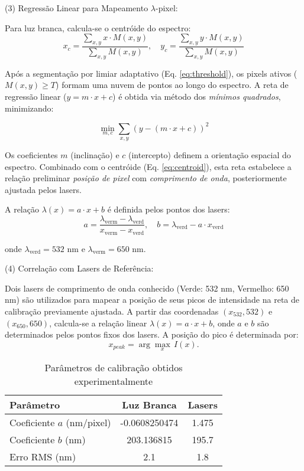 \documentclass[a4paper]{ifacconf}
\begin{document}
(3) Regressão Linear para Mapeamento $\lambda$-pixel:

Para luz branca, calcula-se o centróide do espectro:
\begin{equation}
    x_c = \frac{\sum_{x,y} x \cdot M(x,y)}{\sum_{x,y} M(x,y)}, \quad
    y_c = \frac{\sum_{x,y} y \cdot M(x,y)}{\sum_{x,y} M(x,y)}
    \label{eq:centroid}
\end{equation}

Após a segmentação por limiar adaptativo (Eq. \ref{eq:threshold}), os pixels ativos (\(M(x,y) \geq T\)) formam uma nuvem de pontos ao longo do espectro. A reta de regressão linear (\(y = m \cdot x + c\)) é obtida via método dos \textit{mínimos quadrados}, minimizando:  

\begin{equation}  
    \min_{m,c} \sum_{x,y} \left(y - (m \cdot x + c)\right)^2 
\end{equation}  

Os coeficientes \(m\) (inclinação) e \(c\) (intercepto) definem a orientação espacial do espectro. Combinado com o centróide (Eq. \ref{eq:centroid}), esta reta estabelece a relação preliminar \textit{posição de pixel} com \textit{comprimento de onda}, posteriormente ajustada pelos lasers.  


A relação \(\lambda(x) = a \cdot x + b\) é definida pelos pontos dos lasers:
\begin{equation}
    a = \frac{\lambda_{\text{verm}} - \lambda_{\text{verd}}}{x_{\text{verm}} - x_{\text{verd}}}, \quad  
    b = \lambda_{\text{verd}} - a \cdot x_{\text{verd}}
\end{equation}

onde \(\lambda_{\text{verd}} = 532\) nm e \(\lambda_{\text{verm}} = 650\) nm.

(4) Correlação com Lasers de Referência:

Dois lasers de comprimento de onda conhecido (Verde: 532 nm, Vermelho: 650 nm) são utilizados para mapear a posição de seus picos de intensidade na reta de calibração previamente ajustada. A partir das coordenadas \((x_{532}, 532)\) e \((x_{650}, 650)\), calcula-se a relação linear \(\lambda(x) = a \cdot x + b\), onde \(a\) e \(b\) são determinados pelos pontos fixos dos lasers.
A posição do pico é determinada por:
\begin{equation}
    x_{peak} = \arg \max_{x} \, I(x).
    \label{eq:peak}
\end{equation}

\begin{table}[ht]
    \centering
    \caption{Parâmetros de calibração obtidos experimentalmente}
    \label{tab:calib_params}
    \begin{tabular}{lcc}
        \toprule
        Parâmetro & Luz Branca & Lasers \\
        \hline
        \midrule
        Coeficiente $a$ (nm/pixel) & -0.0608250474 & 1.475 \\
        Coeficiente $b$ (nm) & 203.136815 & 195.7 \\
        Erro RMS (nm) & 2.1 & 1.8 \\
        \hline
        \bottomrule
    \end{tabular}
\end{table}
\end{document}
